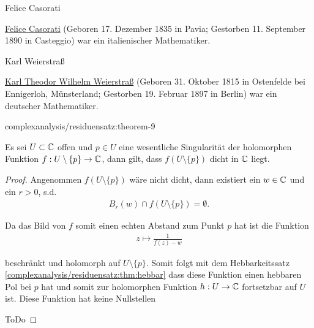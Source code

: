 \begin{emphBox}{Felice Casorati}{}

\par
\href{https://de.wikipedia.org/wiki/Felice\_Casorati\_(Mathematiker)}{Felice Casorati} (Geboren 17. Dezember 1835 in Pavia; Gestorben 11. September 1890 in Casteggio) war ein italienischer Mathematiker.
\end{emphBox}

\begin{emphBox}{Karl Weierstraß}{}

\par
\href{https://de.wikipedia.org/wiki/Karl\_Weierstra\%C3\%9F}{Karl Theodor Wilhelm Weierstraß} (Geboren 31. Oktober 1815 in Ostenfelde bei Ennigerloh, Münsterland; Gestorben 19. Februar 1897 in Berlin) war ein deutscher Mathematiker.
\end{emphBox}
\begin{theorem}{}{complexanalysis/residuensatz:theorem-9}



\par
Es sei \(U \subset \mathbb{C}\) offen und \(p\in U\) eine wesentliche Singularität der holomorphen Funktion \(f:U\setminus\{p\}\to\mathbb{C}\), dann gilt, dass \(f(U\setminus\{p\})\) dicht in \(\mathbb{C}\) liegt.
\end{theorem}

\begin{proof}
 Angenommen \(f(U\setminus\{p\})\) wäre nicht dicht, dann existiert ein \(w\in\mathbb{C}\) und ein \(r>0\), s.d.
\begin{align*}
B_r(w) \cap f(U\setminus\{p\}) = \emptyset.
\end{align*}
\par
Da das Bild von \(f\) somit einen echten Abstand zum Punkt \(p\) hat ist die Funktion
\begin{align*}
z\mapsto\frac{1}{f(z) - w}
\end{align*}
\par
beschränkt und holomorph auf \(U\setminus\{p\}\). Somit folgt mit dem Hebbarkeitssatz \cref{complexanalysis/residuensatz:thm:hebbar}  dass diese Funktion einen hebbaren Pol bei \(p\) hat und somit zur holomorphen Funktion \(h:U\to\mathbb{C}\) fortsetzbar auf \(U\) ist. Diese Funktion hat keine Nullstellen

\par
ToDo
\end{proof}


